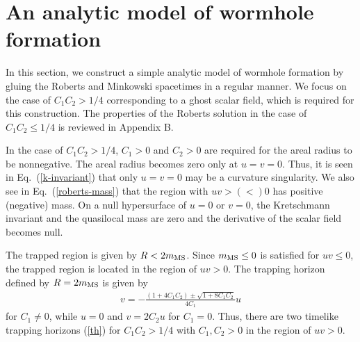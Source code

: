 \documentclass[aps,prd,twocolumn,eqsecnum,showpacs,amsmath]{revtex4}
\begin{document}


\section{An analytic model of wormhole formation}
In this section, we construct a simple analytic model of wormhole formation by gluing the Roberts and Minkowski spacetimes in a regular manner.
We focus on the case of $C_1C_2>1/4$ corresponding to a ghost scalar field, which is required for this construction.
The properties of the Roberts solution in the case of $C_1C_2 \le 1/4$ is reviewed in Appendix B.

In the case of $C_1C_2>1/4$, $C_1>0$ and $C_2>0$ are required for the areal radius to be nonnegative.
The areal radius becomes zero only at $u=v=0$.
Thus, it is seen in Eq.~(\ref{k-invariant}) that only $u=v=0$ may be a curvature singularity.
We also see in Eq.~(\ref{roberts-mass}) that the region with $uv>(<)0$ has positive (negative) mass.
On a null hypersurface of $u=0$ or $v=0$, the Kretschmann invariant and the quasilocal mass are zero and the derivative of the scalar field becomes null.

The trapped region is given by $R<2m_{\rm MS}$.
Since $m_{\rm MS} \le 0$ is satisfied for $uv \le 0$, the trapped region is located in the region of $uv>0$.
The trapping horizon~\cite{hayward1994} defined by $R=2m_{\rm MS}$ is given by
\begin{eqnarray}
v=-\frac{(1+4C_1C_2)\pm \sqrt{1+8C_1C_2}}{4C_1}u \label{th}
\end{eqnarray}
for $C_1 \ne 0$, while $u=0$ and $v=2C_2 u$ for $C_1=0$.
Thus, there are two timelike trapping horizons (\ref{th}) for $C_1C_2>1/4$ with $C_1, C_2>0$ in the region of $uv>0$.
\end{document}
